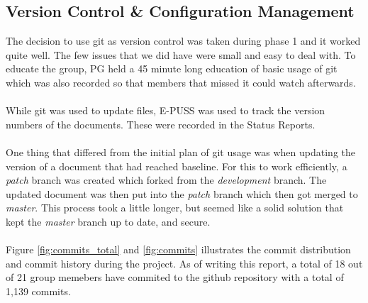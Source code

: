 \documentclass{article}
\begin{document}
      \subsection{Version Control \& Configuration Management \label{cm}}
        The decision to use git as version control was taken during phase 1
        and it worked quite well. The few issues that we did have were small and easy to deal with.
        To educate the group, PG held a 45 minute long education of basic usage of git which was also
        recorded so that members that missed it could watch afterwards.
        \\ \\
        While git was used to update files, E-PUSS was used to track the version numbers
        of the documents. These were recorded in the Status Reports.
        \\ \\
        One thing that differed from the initial plan of git usage was when updating
        the version of a document that had reached baseline. For this to work efficiently,
        a \emph{patch} branch was created which forked from the \emph{development} branch.
        The updated document was then put into the \emph{patch} branch which then got merged
        to \emph{master}. This process took a little longer, but seemed like a solid solution that kept the \emph{master} branch up to date, and secure.
        \\ \\
        Figure \ref{fig:commits_total} and \ref{fig:commits} illustrates the commit distribution
        and commit history during the project. As of writing this report, a total of 18 out of 21 group memebers have commited to the github repository with a total of 1,139 commits.
        
\end{document}
